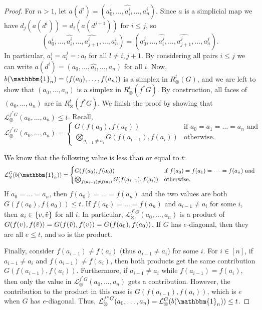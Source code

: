 \documentclass[a4paper,11pt]{article}
\newcommand{\Id}{\mathbbm{1}}
\newcommand{\tensor}{\otimes}
\newcommand{\bigtensor}{\bigotimes}
\theoremstyle{remark}
\begin{document}
\begin{proof}
    For $n > 1$, let $a(d^i)=(a^i_{0},\dots,\widehat{a^i_{i}},\dots,a^i_{n})$. Since $a$ is a simplicial map we have $d_j(a(d^i))=d_{i}(a(d^{j+1}))$ for $i\leq j$, so 
    \begin{equation*}
        (a^i_{0},\dots,\widehat{a^i_{i}},\dots,\widehat{a^i_{j+1}},\dots,a^i_{n}) = (a^j_{0},\dots,\widehat{a^j_{i}},\dots,\widehat{a^j_{j+1}},\dots,a^j_{n}).
    \end{equation*}
    In particular, $a^i_{l}=a^j_{l}=:a_l$ for all $l\neq i,j+1$. By considering all pairs $i\leq j$ we can write $a(d^i)=(a_0,\dots,\widehat{a_i},\dots,a_n)$ for all $i$. Now, $b(\Id_n)=(f(a_0),\dots, f(a_n))$ is a simplex in $R^t_\tensor(G)$, and we are left to show that $(a_0,\dots,a_n)$ is a simplex in $R^t_\tensor(f^*G)$. By construction, all faces of $(a_0,\dots,a_n)$ are in $R^t_\tensor(f^*G)$. We finish the proof by showing that $\mathcal{L}_\tensor^{f^*G}(a_0,\ldots, a_n)\leq t$. Recall, 
    \begin{equation*}
    \mathcal{L}_\tensor^{f^*G}(a_0,\ldots, a_n) =
    \begin{cases}
        G(f(a_0),f(a_0)) &\text{if } a_0=a_1=\dots=a_n\text{ and}\\
        \bigtensor_{a_{i-1}\neq a_{i}}G(f(a_{i-1}),f(a_{i})) &  \text{otherwise.}
    \end{cases}
    \end{equation*} 

    
    We know that the following value is less than or equal to $t$: 
    \begin{equation*}
    \mathcal{L}_\tensor^{G}(b(\Id_n)) =
    \begin{cases}
        G(f(a_0),f(a_0)) &\text{if } f(a_0)=f(a_1)=\dots=f(a_n)\text{ and}\\
        
        \bigtensor_{f(a_{i-1})\neq f(a_{i})}G(f(a_{i-1}),f(a_{i})) &  \text{otherwise.}
    \end{cases}
    \end{equation*}   
    If $a_0=\dots=a_n$, then $f(a_0)=\dots= f(a_n)$ and the two values are both $G(f(a_0),f(a_0))\leq t$. If $f(a_0)=\dots= f(a_n)$ and $a_{i-1}\neq a_i$ for some $i$, then $a_i\in\{v,\Tilde{v}\}$ for all $i$. In particular, $\mathcal{L}_\tensor^{f^*G}(a_0,\ldots, a_n)$ is a product of $G(f(v),f(\Tilde{v}))=G(f(\Tilde{v}),f(v))=G(f(a_0),f(a_0))$. If $G$ has $e$-diagonal, then they are all $e\leq t$, and so is the product. 
    
    Finally, consider $f(a_{i-1})\neq f(a_i)$ (thus $a_{i-1}\neq a_i$) for some $i$. For $i\in[n]$, if $a_{i-1}\neq a_i$ and $f(a_{i-1})\neq f(a_i)$, then both products get the same contribution $G(f(a_{i-1}), f(a_i))$. Furthermore, if $a_{i-1}\neq a_i$ while $f(a_{i-1})= f(a_i)$, then only the value in $\mathcal{L}_\tensor^{f^*G}(a_0,\ldots, a_n)$ gets a contribution. However, the contribution to the product in this case is $G(f(a_{i-1}),f(a_i))$, which is $e$ when $G$ has $e$-diagonal. Thus,  $\mathcal{L}_\tensor^{f^*G}(a_0,\ldots, a_n) = \mathcal{L}^G_\tensor(b(\Id_n))\leq t$. 
    

\end{proof}
\end{document}
